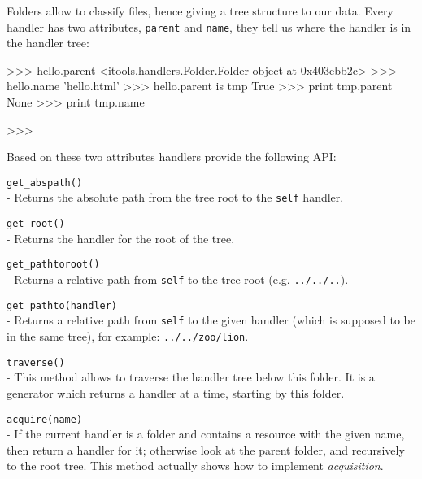 Folders allow to classify files, hence giving a tree structure to our data.
Every handler has two attributes, {\tt parent} and {\tt name}, they tell us
where the handler is in the handler tree:

\begin{code}
    >>> hello.parent
    <itools.handlers.Folder.Folder object at 0x403ebb2c>
    >>> hello.name  
    'hello.html'
    >>> hello.parent is tmp
    True
    >>> print tmp.parent
    None
    >>> print tmp.name

    >>> 
\end{code}

Based on these two attributes handlers provide the following API:

\begin{api}
  {\tt get\_abspath()}\\
  - Returns the absolute path from the tree root to the {\tt self} handler.

  {\tt get\_root()}\\
  - Returns the handler for the root of the tree.

  {\tt get\_pathtoroot()}\\
  - Returns a relative path from {\tt self} to the tree root (e.g.
    {\tt ../../..}).

  {\tt get\_pathto(handler)}\\
  - Returns a relative path from {\tt self} to the given handler (which is
    supposed to be in the same tree), for example: {\tt ../../zoo/lion}.

  {\tt traverse()}\\
  - This method allows to traverse the handler tree below this folder. It
    is a generator which returns a handler at a time, starting by this
    folder.

  {\tt acquire(name)}\\
  - If the current handler is a folder and contains a resource with the given
    name, then return a handler for it; otherwise look at the parent folder,
    and recursively to the root tree. This method actually shows how to
    implement {\em acquisition}.
\end{api}
